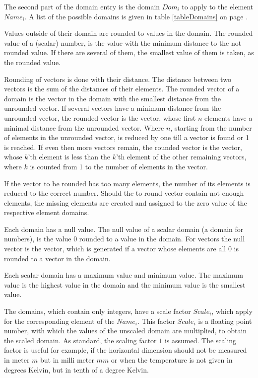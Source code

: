 \bigskip\noindent
The second part of the domain entry is the domain $Dom_i$ to apply to the element $Name_i$. A list of the possible domains is given in table \ref{tableDomains} on page \pageref{tableDomains} .

Values outside of their domain are rounded to values in the domain. The rounded value of a (scalar) number, is the value with the minimum distance to the not rounded value. If there are several of them, the smallest value of them is taken, as the rounded value.

Rounding of vectors is done with their distance. The distance between two vectors is the sum of the distances of their elements. The rounded vector of a domain is the vector in the domain with the smallest distance from the unrounded vector. If several vectors have a minimum distance from the unrounded vector, the rounded vector is the vector, whose first $n$ elements have a minimal distance from the unrounded vector. Where $n$, starting from the number of elements in the unrounded vector, is reduced by one till a vector is found or 1 is reached. If even then more vectors remain, the rounded vector is the vector, whose $k$'th element is less than the $k$'th element of the other remaining vectors, where $k$ is counted from 1 to the number of elements in the vector.

If the vector to be rounded has too many elements, the number of its elements is reduced to the correct number. Should the to round vector contain not enough elements, the missing elements are created and assigned to the zero value of the respective element domains.

Each domain has a null value. The null value of a scalar domain (a domain for numbers), is the value $0$ rounded to a value in the domain.
For vectors the null vector is the vector, which is generated if a vector whose elements are all $0$ is rounded to a vector in the domain.

Each scalar domain has a maximum value and minimum value. The maximum value is the highest value in the domain and the minimum value is the smallest value.

\bigskip\noindent
The domains, which contain only integers, have a scale factor $Scale_i$, which apply for the corresponding element of the $Name_i$. This factor $Scale_i$ is a floating point number, with which the values of the unscaled domain are multiplied, to obtain the scaled domain. As standard, the scaling factor $1$ is assumed. The scaling factor is useful for example, if the horizontal dimension should not be measured in meter $m$ but in milli meter $mm$ or when the temperature is not given in degrees Kelvin, but in tenth of a degree Kelvin.

